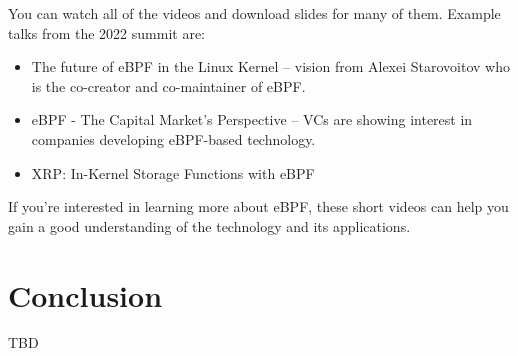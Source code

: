 \noindent
You can watch all of the videos and download slides for many of them. Example talks from the 2022 summit are:

\begin{itemize}
	\item The future of eBPF in the Linux Kernel -- vision from Alexei Starovoitov who is the co-creator and co-maintainer 
		of eBPF.
	\item eBPF - The Capital Market's Perspective -- VCs are showing interest in companies developing 
		eBPF-based technology.
	\item XRP: In-Kernel Storage Functions with eBPF
\end{itemize}

\noindent
If you're interested in learning more about eBPF, these short videos can help you gain a good understanding of the technology and its applications.

\section{Conclusion}

TBD